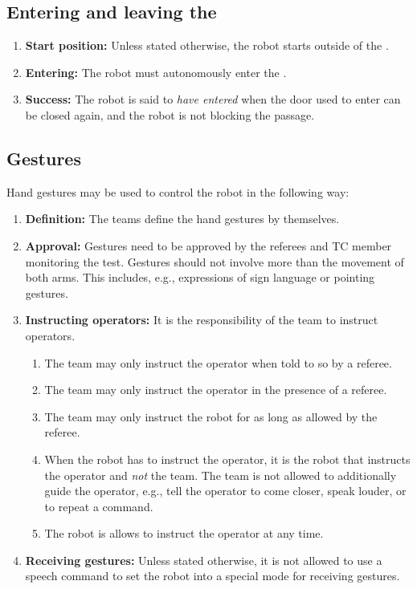 \subsection{Entering and leaving the \Arena{}}
\label{rule:start_position}
\begin{enumerate}

	\item \textbf{Start position:} Unless stated otherwise, the robot starts outside of the \Arena{}.
	\item \textbf{Entering:} The robot must autonomously enter the \Arena{}.
	\item \textbf{Success:} The robot is said to \emph{have entered} when the door used to enter can be closed again, and the robot is not blocking the passage.
\end{enumerate}



\subsection{Gestures}
\label{rule:gestures}
Hand gestures may be used to control the robot in the following way:
\begin{enumerate}
	\item \textbf{Definition:} The teams define the hand gestures by themselves.

	\item \textbf{Approval:} Gestures need to be approved by the referees and TC member monitoring the test. Gestures should not involve more than the movement of both arms. This includes, e.g., expressions of sign language or pointing gestures.

	\item \textbf{Instructing operators:} It is the responsibility of the team to instruct operators.
	\begin{enumerate}
		\item The team may only instruct the operator when told to so by a referee.
		\item The team may only instruct the operator in the presence of a referee.
		\item The team may only instruct the robot for as long as allowed by the referee.
		\item When the robot has to instruct the operator, it is the robot that instructs the operator and \emph{not} the team. The team is not allowed to additionally guide the operator, e.g., tell the operator to come closer, speak louder, or to repeat a command.
		\item The robot is allows to instruct the operator at any time.
	\end{enumerate}

	\item \textbf{Receiving gestures:} Unless stated otherwise, it is not allowed to use a speech command to set the robot into a special mode for receiving gestures.
\end{enumerate}



